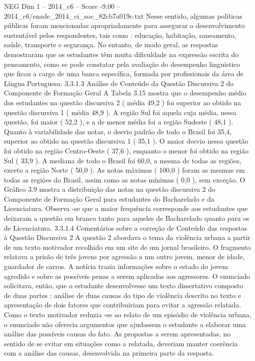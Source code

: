 \begin{textsample}{NEG Dim 1 – 2014\_c6 – Score -9.00 – 2014\_c6/enade\_2014\_ci\_soc\_82cb7a019c.txt}
Nesse sentido, algumas políticas públicas foram mencionadas apropriadamente para assegurar o desenvolvimento sustentável pelos respondentes, tais como : educação, habitação, saneamento, saúde, transporte e segurança.
No entanto, de modo geral, as respostas demostraram que os estudantes têm muita dificuldade na expressão escrita do pensamento, como se pode constatar pela avaliação do desempenho linguístico que ficou a cargo de uma banca específica, formada por profissionais da área de Língua Portuguesa. 3.3.1.3 Análise de Conteúdo da Questão Discursiva 2 do Componente de Formação Geral A Tabela 3.15 mostra que o desempenho médio dos estudantes na questão discursiva 2 ( média 49,2 ) foi superior ao obtido na questão discursiva 1 ( média 48,9 ).
A região Sul foi aquela cuja média, nessa questão, foi maior ( 52,2 ), e a de menor média foi a região Sudeste ( 48,1 ).
Quanto à variabilidade das notas, o desvio padrão de todo o Brasil foi 35,4, superior ao obtido na questão discursiva 1 ( 35,1 ).
O maior desvio nessa questão foi obtido na região Centro-Oeste ( 37,6 ), enquanto o menor foi obtido na região Sul ( 33,9 ).
A mediana de todo o Brasil foi 60,0, a mesma de todas as regiões, exceto a região Norte ( 50,0 ).
As notas máximas ( 100,0 ) foram as mesmas em todas as regiões do Brasil, assim como as notas mínimas ( 0,0 ), sem exceção.
O Gráfico 3.9 mostra a distribuição das notas na questão discursiva 2 do Componente de Formação Geral para estudantes do Bacharelado e da Licenciatura.
Observa -se que a maior frequência corresponde aos estudantes que deixaram a questão em branco tanto para aqueles de Bacharelado quanto para os de Licenciatura. 3.3.1.4 Comentários sobre a correção de Conteúdo das respostas à Questão Discursiva 2 A questão 2 abordava o tema da violência urbana a partir de um texto motivador recolhido em um site de um jornal brasileiro.
O fragmento relatava a prisão de três jovens por agressão a um outro jovem, menor de idade, guardador de carros.
A notícia trazia informações sobre o estado do jovem agredido e sobre as possíveis penas a serem aplicadas aos agressores.
O enunciado solicitava, então, que o estudante desenvolvesse um texto dissertativo composto de duas partes : análise de duas causas do tipo de violência descrito no texto e apresentação de dois fatores que contribuiriam para evitar a agressão relatada.
Como o texto motivador reduzia -se ao relato de um episódio de violência urbana, o enunciado não oferecia argumentos que ajudassem o estudante a elaborar uma análise das possíveis causas do fato.
As propostas a serem apresentadas, no sentido de se evitar em situações como a relatada, deveriam manter coerência com a análise das causas, desenvolvida na primeira parte da resposta.

\end{textsample}
